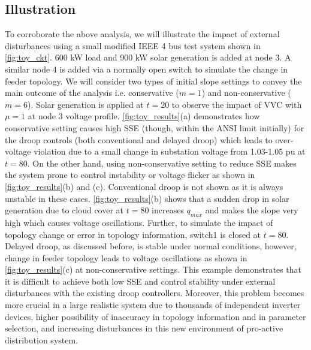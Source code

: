 \documentclass[journal]{IEEEtran}
\begin{document}
\subsection{Illustration}
To corroborate the above analysis, we will illustrate the impact of external disturbances using a small modified IEEE 4 bus test system shown in \figurename\ref{fig:toy_ckt}. 600 kW load and 900 kW solar generation is added at node 3. A similar node 4 is added via a normally open switch to simulate the change in feeder topology. We will consider two types of initial slope settings to convey the main outcome of the analysis i.e. conservative ($m=1$) and non-conservative ($m=6$). Solar generation is applied at $t=20$ to observe the impact of VVC with $\mu=1$ at node 3 voltage profile. 
\figurename\ref{fig:toy_results}(a) demonstrates how conservative setting causes high SSE (though, within the ANSI limit initially) for the droop controls (both conventional and delayed droop) which leads to over-voltage violation due to a small change in substation voltage from 1.03-1.05 pu at $t=80$. On the other hand, using non-conservative setting to reduce SSE makes the system prone to control instability or voltage flicker as shown in \figurename\ref{fig:toy_results}(b) and (c). Conventional droop is not shown as it is always unstable in these cases. \figurename\ref{fig:toy_results}(b) shows that a sudden drop in solar generation due to cloud cover at $t=80$ increases $q_{max}$ and makes the slope very high which causes voltage oscillations. Further, to simulate the impact of topology change or error in topology information, switch1 is closed at $t=80$. Delayed droop, as discussed before, is stable under normal conditions, however, change in feeder topology leads to voltage oscillations as shown in \figurename\ref{fig:toy_results}(c) at non-conservative settings. This example demonstrates that it is difficult to achieve both low SSE and control stability under external disturbances with the existing droop controllers. Moreover, this problem becomes more crucial in a large realistic system due to thousands of independent inverter devices, higher possibility of inaccuracy in topology information and in parameter selection, and increasing disturbances in this new environment of pro-active distribution system.
\end{document}
